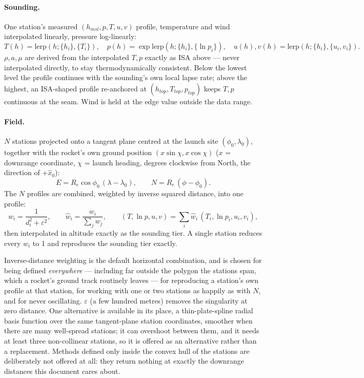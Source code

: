 \paragraph{Sounding.} One station's measured $(h_{msl}, p, T, u, v)$ profile, temperature and wind
interpolated linearly, pressure log-linearly:
\begin{equation}
    T(h) = \mathrm{lerp}(h;\{h_i\},\{T_i\}), \quad
    p(h) = \exp\mathrm{lerp}(h;\{h_i\},\{\ln p_i\}), \quad
    u(h),v(h) = \mathrm{lerp}(h;\{h_i\},\{u_i,v_i\}).
\end{equation}
$\rho, a, \mu$ are derived from the interpolated $T, p$ exactly as ISA above --- never interpolated
directly, to stay thermodynamically consistent. Below the lowest level the profile continues with
the sounding's own local lapse rate; above the highest, an ISA-shaped profile re-anchored at
$(h_{top}, T_{top}, p_{top})$ keeps $T, p$ continuous at the seam. Wind is held at the edge value
outside the data range.

\paragraph{Field.} $N$ stations projected onto a tangent plane centred at the launch site
$(\phi_0,\lambda_0)$, together with the rocket's own ground position $(x\sin\chi, x\cos\chi)$
($x$ = downrange coordinate, $\chi$ = launch heading, degrees clockwise from North, the direction
of $+\hat{x}_0$):
\begin{equation}
    E = R_e\cos\phi_0\,(\lambda-\lambda_0), \qquad N = R_e\,(\phi-\phi_0).
\end{equation}
The $N$ profiles are combined, weighted by inverse squared distance, into one profile:
\begin{equation}
    w_i = \frac{1}{d_i^2+\varepsilon^2}, \qquad \hat{w}_i = \frac{w_i}{\sum_j w_j}, \qquad
    (T, \ln p, u, v) = \sum_i \hat{w}_i\,(T_i, \ln p_i, u_i, v_i),
\end{equation}
then interpolated in altitude exactly as the sounding tier. A single station reduces every
$\hat{w}_i$ to 1 and reproduces the sounding tier exactly.

Inverse-distance weighting is the default horizontal combination, and is chosen for being defined
\emph{everywhere} --- including far outside the polygon the stations span, which a rocket's ground
track routinely leaves --- for reproducing a station's own profile at that station, for working
with one or two stations as happily as with $N$, and for never oscillating. $\varepsilon$ (a few
hundred metres) removes the singularity at zero distance. One alternative is available in its
place, a thin-plate-spline radial basis function over the same tangent-plane station coordinates,
smoother when there are many well-spread stations; it can overshoot between them, and it needs at
least three non-collinear stations, so it is offered as an alternative rather than a replacement.
Methods defined only inside the convex hull of the stations are deliberately not offered at all:
they return nothing at exactly the downrange distances this document cares about.

